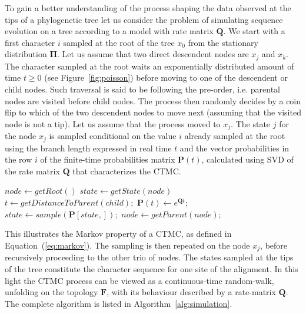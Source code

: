 To gain a better understanding of the process shaping the data observed at the tips of a phylogenetic tree let us consider the problem of simulating sequence evolution on a tree according to a model with rate matrix $\mathbf{Q}$.
We start with a first character $i$ sampled at the root of the tree $x_0$ from the stationary distribution $\mathbf{\Pi}$.
Let us assume that two direct descendent nodes are $x_j$ and $x_k$.
The character sampled at the root waits an exponentially distributed amount of time $t\geq0$ (see Figure~\ref{fig:poisson}) before moving to one of the descendent or child nodes.
Such traversal is said to be following the pre-order, i.e. parental nodes are visited before child nodes.   
The process then randomly decides by a coin flip to which of the two descendent nodes to move next (assuming that the visited node is not a tip).
Let us assume that the process moved to $x_j$.
The state $j$ for the node $x_j$ is sampled conditional on the value $i$ already sampled at the root using the branch length expressed in real time $t$ and the vector probabilities in the row $i$ of the finite-time probabilities matrix $\mathbf{P}(t)$, calculated using SVD of the rate matrix $\mathbf{Q}$ that characterizes the CTMC.   

\begin{algorithm}[H]
\centering
\begin{algorithmic}[1]
%
\State $node \gets getRoot\left(\right)$
%
\State $state \gets getState\left(node\right)$
%
\Repeat
%
%
%
\State $t \gets getDistanceToParent\left(child\right);$
%
\State $ \mathbf{P}\left(t\right) \gets e^{\mathbf{Q}t};$
%
\State $state \gets sample\left(\mathbf{P}\left[ state, \right]\right);$
%
\EndFor
%
\Else {}
%
\State $node \gets getParent\left(node\right);$
%
\EndIf
%
\end{algorithmic}
\caption{
{ \footnotesize 
{\bf Simulation an evolutionary process along a phylogeny.} 
When a child node is visited, the state is sampled with conditional probabilities of changing to state $j$ given state $i$ at the parental node.
}%
}
\label{alg:simulation}
\end{algorithm}

This illustrates the Markov property of a CTMC, as defined in Equation~(\ref{eq:markov}).
The sampling is then repeated on the node $x_j$, before recursively proceeding to the other trio of nodes.
The states sampled at the tips of the tree constitute the character sequence for one site of the alignment.
In this light the CTMC process can be viewed as a continuous-time random-walk, unfolding on the topology $\mathbf{F}$, with its behaviour described by a rate-matrix $\mathbf{Q}$.
The complete algorithm is listed in Algorithm~\ref{alg:simulation}.

